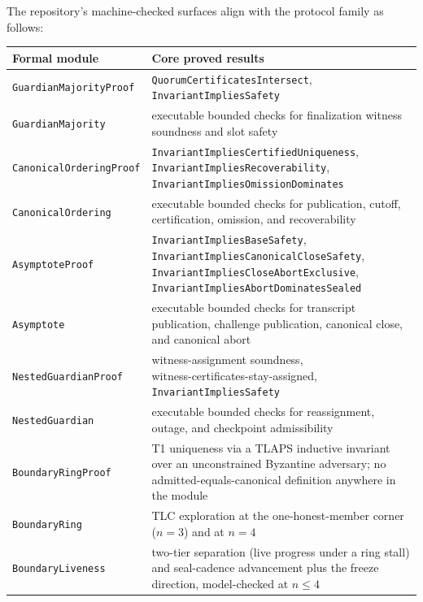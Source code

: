 \documentclass[11pt]{article}
\newcommand{\code}[1]{\texttt{#1}}
\begin{document}
The repository's machine-checked surfaces align with the protocol family as
follows:

\begin{center}
\scriptsize
\begin{tabularx}{\textwidth}{>{\raggedright\arraybackslash}p{} X}
\toprule
\textbf{Formal module} & \textbf{Core proved results} \\
\midrule
\code{GuardianMajorityProof} & \code{QuorumCertificatesIntersect}, \code{InvariantImpliesSafety} \\
\code{GuardianMajority} & executable bounded checks for finalization witness soundness and slot safety \\
\code{CanonicalOrderingProof} & \shortstack[l]{\code{InvariantImpliesCertifiedUniqueness},\\\code{InvariantImpliesRecoverability},\\\code{InvariantImpliesOmissionDominates}} \\
\code{CanonicalOrdering} & executable bounded checks for publication, cutoff, certification, omission, and recoverability \\
\code{AsymptoteProof} & \shortstack[l]{\code{InvariantImpliesBaseSafety},\\\code{InvariantImpliesCanonicalCloseSafety},\\\code{InvariantImpliesCloseAbortExclusive},\\\code{InvariantImpliesAbortDominatesSealed}} \\
\code{Asymptote} & executable bounded checks for transcript publication, challenge publication, canonical close, and canonical abort \\
\code{NestedGuardianProof} & \shortstack[l]{witness-assignment soundness,\\witness-certificates-stay-assigned,\\\code{InvariantImpliesSafety}} \\
\code{NestedGuardian} & executable bounded checks for reassignment, outage, and checkpoint admissibility \\
\midrule
\code{BoundaryRingProof} & T1 uniqueness via a TLAPS inductive invariant over an unconstrained Byzantine adversary; no admitted-equals-canonical definition anywhere in the module \\
\code{BoundaryRing} & TLC exploration at the one-honest-member corner (\(n = 3\)) and at \(n = 4\) \\
\code{BoundaryLiveness} & two-tier separation (live progress under a ring stall) and seal-cadence advancement plus the freeze direction, model-checked at \(n \le 4\) \\

\end{tabularx}
\end{center}
\end{document}
